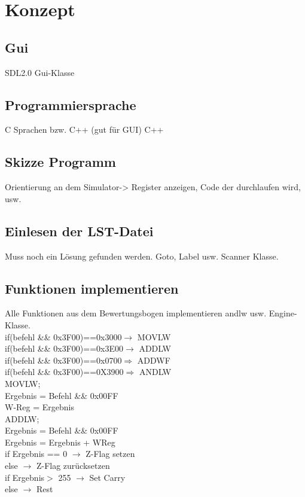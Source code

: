 \section{Konzept}

\subsection{Gui}
SDL2.0
Gui-Klasse


\subsection{Programmiersprache}
C Sprachen bzw. C++ (gut für GUI)
C++

\subsection{Skizze Programm}

Orientierung an dem Simulator-> Register anzeigen, Code der durchlaufen wird, usw.

\subsection{Einlesen der LST-Datei}
Muss noch ein Lösung gefunden werden.
Goto, Label usw.
Scanner Klasse.

\subsection{Funktionen implementieren}
Alle Funktionen aus dem Bewertungsbogen implementieren andlw usw. 
Engine-Klasse.\\
if(befehl \&\& 0x3F00)==0x3000$\longrightarrow$ MOVLW\\
if(befehl \&\& 0x3F00)==0x3E00$\longrightarrow$ ADDLW\\
if(befehl \&\& 0x3F00)==0x0700$\Longrightarrow$ ADDWF\\
if(befehl \&\& 0x3F00)==0X3900$\Longrightarrow$ ANDLW\\
MOVLW;\\
Ergebnis = Befehl \&\&  0x00FF\\
W-Reg = Ergebnis\\

ADDLW;\\
Ergebnis = Befehl \&\& 0x00FF\\
Ergebnis = Ergebnis + WReg\\
if Ergebnis == 0 $\longrightarrow$ Z-Flag setzen\\
else $\longrightarrow$ Z-Flag zurücksetzen\\
if Ergebnis$>$ 255 $\longrightarrow$ Set Carry\\
else $\longrightarrow$ Rest \\

